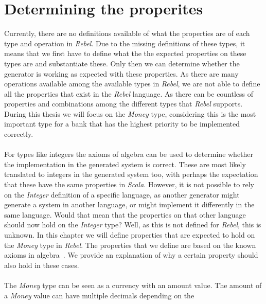 \section{Determining the properites}
Currently, there are no definitions available of what the properties are of each
type and operation in \textit{Rebel}. Due to the missing definitions of these
types, it means that we first have to define what the the expected properties
on these types are and substantiate these. Only then we can determine whether
the generator is working as expected with these properties. As there are many
operations available among the available types in \textit{Rebel}, we are not
able to define all the properties that exist in the \textit{Rebel} language. As
there can be countless of properties and combinations among the different types
that \textit{Rebel} supports. During this thesis we will focus on the
\textit{Money} type, considering this is the most important type for a bank that
has the highest priority to be implemented correctly.\\
\\
For types like integers the axioms of algebra can be used to determine whether
the implementation in the generated system is correct. These are most likely
translated to integers in the generated system too, with perhaps the expectation
that these have the same properties in \textit{Scala}. However, it is not
possible to rely on the \textit{Integer} definition of a specific language, as
another generator might generate a system in another language, or might
implement it differently in the same language. Would that mean that the
properties on that other language should now hold on the \textit{Integer} type?
Well, as this is not defined for \textit{Rebel}, this is unknown. In this
chapter we will define properties that are expected to hold on the
\textit{Money} type in \textit{Rebel}. The properties that we define are based
on the known axioms in
algebra~\cite{baumgart1961axioms,raftery2011perspective,apostol2007calculus}.
We provide an explanation of why a certain property should also hold in these
cases.\\
\\
The \textit{Money} type can be seen as a currency with an amount value. The
amount of a \textit{Money} value can have multiple decimals depending on the
